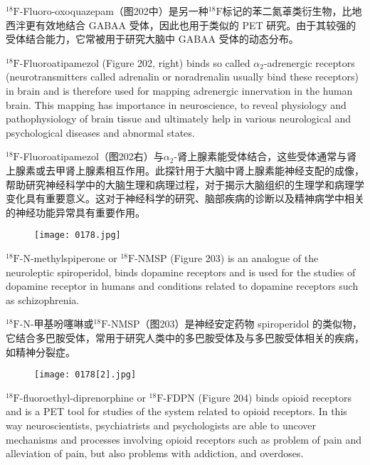 \documentclass[dvipsnames, svgnames,a4paper,11pt]{article}
\begin{document}
${}^\mathrm{18}\mathrm{F}$-Fluoro-oxoquazepam（图202中）是另一种${}^\mathrm{18}\mathrm{F}$标记的苯二氮䓬类衍生物，比地西泮更有效地结合 GABAA 受体，因此也用于类似的 PET 研究。由于其较强的受体结合能力，它常被用于研究大脑中 GABAA 受体的动态分布。


${}^\mathrm{18}\mathrm{F}$-Fluoroatipamezol (Figure 202, right) binds so called $\alpha_2$-adrenergic receptors
(neurotransmitters called adrenalin or noradrenalin usually bind these receptors) in
brain and is therefore used for mapping adrenergic innervation in the human brain.
This mapping has importance in neuroscience, to reveal physiology and
pathophysiology of brain tissue and ultimately help in various neurological and
psychological diseases and abnormal states.

${}^\mathrm{18}\mathrm{F}$-Fluoroatipamezol（图202右）与$\alpha_2$-肾上腺素能受体结合，这些受体通常与肾上腺素或去甲肾上腺素相互作用。此探针用于大脑中肾上腺素能神经支配的成像，帮助研究神经科学中的大脑生理和病理过程，对于揭示大脑组织的生理学和病理学变化具有重要意义。这对于神经科学的研究、脑部疾病的诊断以及精神病学中相关的神经功能异常具有重要作用。

\begin{figure}[h]
	\centering
    \texttt{[image: 0178.jpg]}   
     \label{fig203}
\end{figure}

${}^\mathrm{18}\mathrm{F}$-N-methylspiperone or ${}^\mathrm{18}\mathrm{F}$-NMSP (Figure 203) is an analogue of the neuroleptic
spiroperidol, binds dopamine receptors and is used for the studies of dopamine
receptor in humans and conditions related to dopamine receptors such as
schizophrenia.

${}^\mathrm{18}\mathrm{F}$-N-甲基吩噻啉或${}^\mathrm{18}\mathrm{F}$-NMSP（图203）是神经安定药物 spiroperidol 的类似物，它结合多巴胺受体，常用于研究人类中的多巴胺受体及与多巴胺受体相关的疾病，如精神分裂症。
\begin{figure}[h]
	\centering
    \texttt{[image: 0178[2].jpg]}   
     \label{fig204}
\end{figure}

${}^\mathrm{18}\mathrm{F}$-fluoroethyl-diprenorphine or ${}^\mathrm{18}\mathrm{F}$-FDPN (Figure 204) binds opioid receptors and is
a PET tool for studies of the system related to opioid receptors. In this way
neuroscientists, psychiatrists and psychologists are able to uncover mechanisms
and processes involving opioid receptors such as problem of pain and alleviation of
pain, but also problems with addiction, and overdoses.
\end{document}

